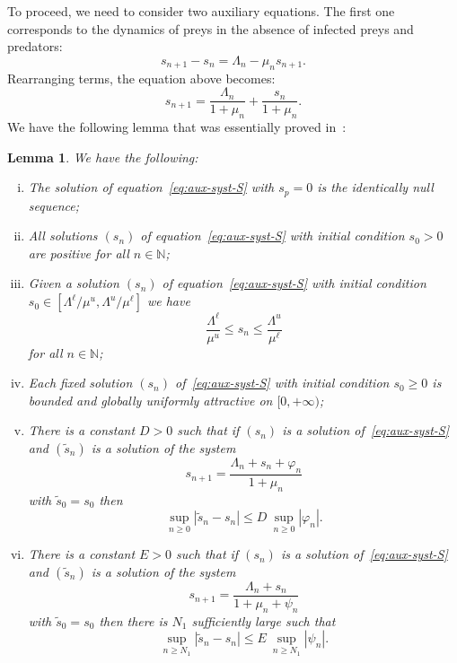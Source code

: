 \documentclass[reqno]{amsart}
\newtheorem{lemma}{Lemma}
\renewcommand{\phi}{\varphi}
\renewcommand{\le}{\leqslant}
\renewcommand{\ge}{\geqslant}
\newcommand{\N}{\ensuremath{\mathds N}}
\begin{document}
{{To proceed, we need to consider two auxiliary equations. The first one corresponds to the dynamics of preys in the absence of infected preys and predators:
\[
s_{n+1}-s_n=\Lambda_n-\mu_n s_{n+1}.
\]
Rearranging terms, the equation above becomes:
\begin{equation}\label{eq:aux-syst-S}
s_{n+1}=\frac{\Lambda_n}{1+\mu_n}+\frac{s_n}{1+\mu_n}.
\end{equation}
We have the following lemma that was essentially proved in~\cite{Mateus-IJDE-2016}:
\begin{lemma}\label{lemma:aux-S}
We have the following:
\begin{enumerate}[i)]
\item \label{Cond-C1-aux}
The solution of equation~\eqref{eq:aux-syst-S} with $s_p=0$ is the identically null sequence;
\item \label{Cond-C1a-aux}
All solutions $(s_n)$ of equation~\eqref{eq:aux-syst-S} with initial condition $s_0 > 0$ are positive for all $n \in \N$;
\item \label{Cond-C1b-aux}
Given a solution $(s_n)$ of equation~\eqref{eq:aux-syst-S} with initial condition $s_0 \in [\Lambda^\ell/\mu^u, \Lambda^u/\mu^\ell]$ we have
    $$\dfrac{\Lambda^\ell}{\mu^u} \le s_n \le \dfrac{\Lambda^u}{\mu^\ell}$$ for all $n \in \N$;
\item \label{Cond-C3-aux} Each fixed solution $(s_n)$ of~\eqref{eq:aux-syst-S} with initial condition $s_0 \ge 0$ is bounded and globally uniformly attractive on $[0,+\infty)$;
\item \label{cond-3-aux} There is a constant $D>0$ such that if $(s_n)$ is a solution of~\eqref{eq:aux-syst-S} and $(\tilde s_n)$ is a solution of the system
\begin{equation}\label{eq:sist-aux-f}
s_{n+1}=\dfrac{\Lambda_n +s_n+\phi_n}{1+ \mu_n}
\end{equation}
with $\tilde s_0=s_0$ then
\[
\sup_{n \ge 0} |\tilde s_n - s_n| \le D \ \sup_{n \ge 0} |\phi_n|.
\]
\item \label{cond-4-aux} There is a constant $E>0$ such that if $(s_n)$ is a solution of~\eqref{eq:aux-syst-S} and $(\tilde s_n)$ is a solution of the system
\begin{equation}\label{eq:sist-aux-f-2}
s_{n+1}=\dfrac{\Lambda_n +s_n}{1+ \mu_n+\psi_n}
\end{equation}
with $\tilde s_0=s_0$ then there is $N_1$ sufficiently large such that
\[
\sup_{n \ge N_1} |\tilde s_n - s_n| \le E \ \sup_{n \ge N_1} |\psi_n|.
\]
\end{enumerate}
\end{lemma}

}}
\end{document}
